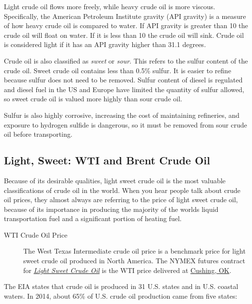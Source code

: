 \documentclass[]{book}
\theoremstyle{definition}
\theoremstyle{definition}
\theoremstyle{remark}
\begin{document}
Light crude oil flows more freely, while heavy crude oil is more
viscous. Specifically, the American Petroleum Institute gravity (API
gravity) is a measure of how heavy crude oil is compared to water. If
API gravity is greater than 10 the crude oil will float on water. If it
is less than 10 the crude oil will sink. Crude oil is considered light
if it has an API gravity higher than 31.1 degrees.

Crude oil is also classified as \emph{sweet} or \emph{sour}. This refers
to the sulfur content of the crude oil. Sweet crude oil contains less
than 0.5\% sulfur. It is easier to refine because sulfur does not need
to be removed. Sulfur content of diesel is regulated and diesel fuel in
the US and Europe have limited the quantity of sulfur allowed, so sweet
crude oil is valued more highly than sour crude oil.

Sulfur is also highly corrosive, increasing the cost of maintaining
refineries, and exposure to hydrogen sulfide is dangerous, so it must be
removed from sour crude oil before transporting.

\subsection{Light, Sweet: WTI and Brent Crude
Oil}\label{light-sweet-wti-and-brent-crude-oil}

Because of its desirable qualities, light sweet crude oil is the most
valuable classifications of crude oil in the world. When you hear people
talk about crude oil prices, they almost always are referring to the
price of light sweet crude oil, because of its importance in producing
the majority of the worlds liquid transportation fuel and a significant
portion of heating fuel.

\begin{description}
\item[WTI Crude Oil Price]
The West Texas Intermediate crude oil price is a benchmark price for
light sweet crude oil produced in North America. The NYMEX futures
contract for
\href{http://www.cmegroup.com/trading/energy/crude-oil/light-sweet-crude.html}{\emph{Light
Sweet Crude Oil}} is the WTI price delivered at
\href{https://www.google.com/maps/place/Cushing,+OK+74023/@43.8498418,-87.2836175,5.17z/data=!4m2!3m1!1s0x87b169f80014c5c1:0xfe855f1914b195a}{Cushing,
OK}.
\end{description}

The EIA states that crude oil is produced in 31 U.S. states and in U.S.
coastal waters. In 2014, about 65\% of U.S. crude oil production came
from five states:
\end{document}
